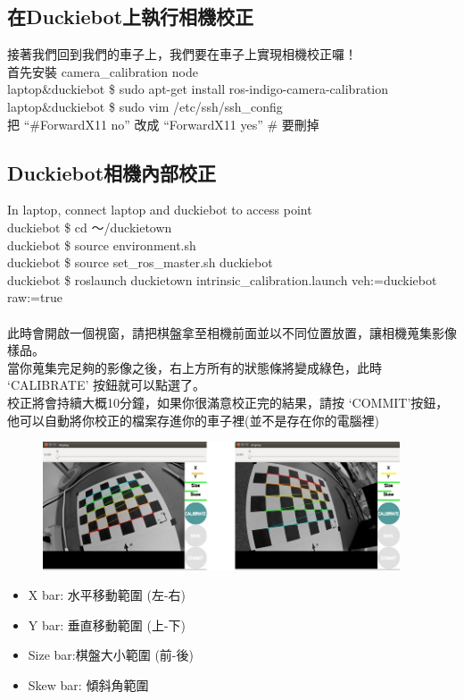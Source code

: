 \documentclass{article}
\begin{document}
\subsection{在Duckiebot上執行相機校正}

接著我們回到我們的車子上，我們要在車子上實現相機校正囉！
\\首先安裝 camera\_calibration node
\\laptop\&duckiebot \$ sudo apt-get install ros-indigo-camera-calibration
\\laptop\&duckiebot \$ sudo vim /etc/ssh/ssh\_config
\\把 “\#ForwardX11 no”  改成 “ForwardX11 yes”  \# 要刪掉

\subsection{Duckiebot相機內部校正}

In laptop, connect laptop and duckiebot to access point
\\duckiebot \$ cd ～/duckietown
\\duckiebot \$ source environment.sh
\\duckiebot \$ source set\_ros\_master.sh duckiebot
\\duckiebot \$ roslaunch duckietown intrinsic\_calibration.launch veh:=duckiebot raw:=true
\\
\\此時會開啟一個視窗，請把棋盤拿至相機前面並以不同位置放置，讓相機蒐集影像樣品。
\\當你蒐集完足夠的影像之後，右上方所有的狀態條將變成綠色，此時 ‘CALIBRATE’ 按鈕就可以點選了。
\\校正將會持續大概10分鐘，如果你很滿意校正完的結果，請按 ‘COMMIT’按鈕，他可以自動將你校正的檔案存進你的車子裡(並不是存在你的電腦裡)
\begin{figure}[htp]
    \begin{center}
        \includegraphics[width=300pt]{pic/圖片15.jpg}
    \end{center}
\end{figure}

\begin{itemize}

\item X bar: 水平移動範圍 (左-右)
\item Y bar: 垂直移動範圍 (上-下)
\item Size bar:棋盤大小範圍 (前-後)
\item Skew bar: 傾斜角範圍

\end{itemize}
\end{document}
